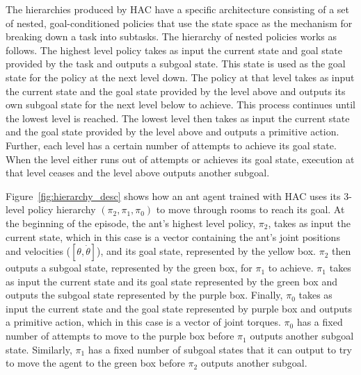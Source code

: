 \documentclass{article} %
\begin{document}
The hierarchies produced by HAC have a specific architecture consisting of a set of nested, goal-conditioned policies that use the state space as the mechanism for breaking down a task into subtasks.  The hierarchy of nested policies works as follows.  The highest level policy takes as input the current state and goal state provided by the task and outputs a subgoal state.  This state is used as the goal state for the policy at the next level down.  The policy at that level takes as input the current state and the goal state provided by the level above and outputs its own subgoal state for the next level below to achieve.  This process continues until the lowest level is reached.  The lowest level then takes as input the current state and the goal state provided by the level above and outputs a primitive action. Further, each level has a certain number of attempts to achieve its goal state.  When the level either runs out of attempts or achieves its goal state, execution at that level ceases and the level above outputs another subgoal. 

Figure~\ref{fig:hierarchy_desc} shows how an ant agent trained with HAC uses its 3-level policy hierarchy $(\pi_2, \pi_1, \pi_0)$ to move through rooms to reach its goal.  At the beginning of the episode, the ant's highest level policy, $\pi_2$, takes as input the current state, which in this case is a vector containing the ant's joint positions and velocities ($[\theta,\dot{\theta}]$), and its goal state, represented by the yellow box.  $\pi_2$ then outputs a subgoal state,  represented by the green box, for $\pi_1$ to achieve.  $\pi_1$ takes as input the current state and its goal state represented by the green box and outputs the subgoal state represented by the purple box. Finally, $\pi_0$ takes as input the current state and the goal state represented by purple box and outputs a primitive action, which in this case is a vector of joint torques. $\pi_0$ has a fixed number of attempts to move to the purple box before $\pi_1$ outputs another subgoal state.  Similarly, $\pi_1$ has a fixed number of subgoal states that it can output to try to move the agent to the green box before $\pi_2$ outputs another subgoal.
\end{document}
